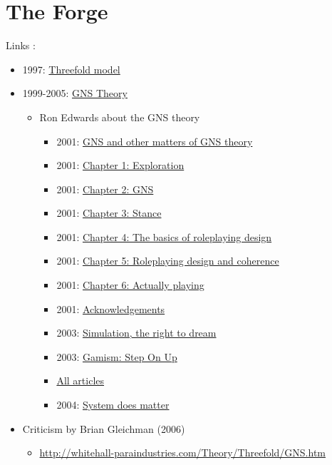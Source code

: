\documentclass[a4paper, 11pt, twoside]{article}
\begin{document}
\section{The Forge}
\label{sec:orgf95fe2f}

Links :
\begin{itemize}
\item 1997: \href{https://en.wikipedia.org/wiki/Threefold\_model}{Threefold model}
\item 1999-2005: \href{https://en.wikipedia.org/wiki/GNS\_theory}{GNS Theory}
\begin{itemize}
\item Ron Edwards about the GNS theory
\begin{itemize}
\item 2001: \href{http://www.indie-rpgs.com/articles/1/}{GNS and other matters of GNS theory}
\item 2001: \href{http://www.indie-rpgs.com/articles/2/}{Chapter 1: Exploration}
\item 2001: \href{http://www.indie-rpgs.com/articles/3/}{Chapter 2: GNS}
\item 2001: \href{http://www.indie-rpgs.com/articles/4/}{Chapter 3: Stance}
\item 2001: \href{http://www.indie-rpgs.com/articles/5/}{Chapter 4: The basics of roleplaying design}
\item 2001: \href{http://www.indie-rpgs.com/articles/6/}{Chapter 5: Roleplaying design and coherence}
\item 2001: \href{http://www.indie-rpgs.com/articles/7/}{Chapter 6: Actually playing}
\item 2001: \href{http://www.indie-rpgs.com/articles/8/}{Acknowledgements}
\item 2003: \href{http://www.indie-rpgs.com/articles/15/}{Simulation, the right to dream}
\item 2003: \href{http://www.indie-rpgs.com/articles/21/}{Gamism: Step On Up}
\item \href{http://www.indie-rpgs.com/articles/}{All articles}
\item 2004: \href{http://www.indie-rpgs.com/\_articles/system\_does\_matter.html}{System does matter}
\end{itemize}
\end{itemize}
\item Criticism by Brian Gleichman (2006)
\begin{itemize}
\item \url{http://whitehall-paraindustries.com/Theory/Threefold/GNS.htm}

\end{itemize}
\end{itemize}
\end{document}
